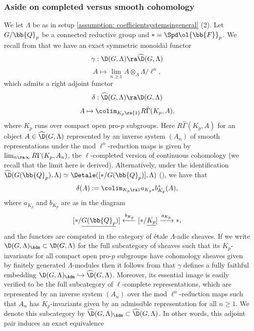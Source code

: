 \documentclass[letterpaper,11pt]{amsart}
\begin{document}
\subsubsection{Aside on completed versus smooth cohomology}
We let $\Lambda$ be as in setup \ref{assumption: coefficientsystemsingeneral} (2). Let $G/\bb{Q}_{p}$ be a connected reductive group and $\ast = \Spd \ol{\bb{F}}_p$. We recall from \cite[Section~2.2]{HansenSupercuspidalCohomology} that we have an exact symmetric monoidal functor 
\begin{equation}{\label{eqn: LCompletionFunctor}}
\gamma: \D(G,\Lambda) \ra \widehat{\D}(G,\Lambda) 
\end{equation}
\[ A \mapsto \lim_{n \geq 1} A \otimes_{\Lambda} \Lambda/\ell^{n},\]
which admits a right adjoint functor 
\begin{equation}{\label{eqn: SmoothVectorsofLcomplete}}
\delta: \widehat{\D}(G,\Lambda) \ra \D(G,\Lambda) 
\end{equation}
\[ A \mapsto \colim_{K_{p} \ra \{1\}} R\hat{\Gamma}(K_{p},A), \]
where $K_{p}$ runs over compact open pro-$p$ subgroups. Here $R\hat{\Gamma}(K_{p},A)$ for an object $A \in \widehat{\D}(G,\Lambda)$ represented by an inverse system $(A_{n})$ of smooth representations under the mod $\ell^{n}$-reduction maps is given by $\lim_{n \ra \infty} R\Gamma(K_{p},A_{n})$, the $\ell$-completed version of continuous cohomology (we recall that the limit here is derived). Alternatively, under the identification $\widehat{\D}(G(\bb{Q}_{p}),\Lambda) \simeq \Detale([\ast/G(\bb{Q}_{p})],\Lambda)$ (\cite[Proposition~2.6 (1)]{HansenSupercuspidalCohomology}), we have that 
\[ \delta(A) := \colim_{K_{p} \ra 1} a_{K_{p}*}b_{K_{p}}^{*}(A), \]
where $a_{K_{p}}$ and $b_{K_{p}}$ are as in the diagram 
\[[\ast/\underline{G(\bb{Q}_{p}})] \xleftarrow{b_{K_{p}}} [\ast/\underline{K_{p}}] \xrightarrow{a_{K_{p}}} \ast, \] 
and the functors are computed in the category of \'etale $\Lambda$-adic sheaves. If we write $\D(G,\Lambda)_{\Adm} \subset \D(G,\Lambda)$ for the full subcategory of sheaves such that its $K_{p}$-invariants for all compact open pro-$p$ subgroups have cohomology sheaves given by finitely generated $\Lambda$-modules then it follows from \cite[Proposition~2.6 (3)]{HansenSupercuspidalCohomology} that $\gamma$ defines a fully faithful embedding $\D(G,\Lambda)_{\Adm} \hookrightarrow \widehat{\D}(G,\Lambda)$. Moreover, its essential image is easily verified to be the full subcategory of $\ell$-complete representations, which are represented by an inverse system $(A_{n})$ over the mod $\ell^{n}$-reduction maps such that $A_{n}$ has $K_{p}$-invariants given by an admissible representation for all $n \geq 1$. We denote this subcategory by $\widehat{\D}(G,\Lambda)_{\Adm} \subset \widehat{\D}(G,\Lambda)$. In other words, this adjoint pair induces an exact equivalence
\end{document}
